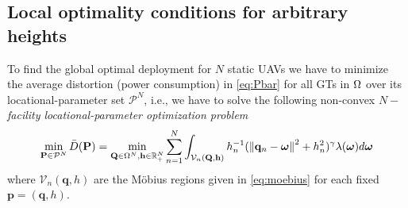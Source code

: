 \documentclass[smallabstract,smallcaptions]{dccpaper}
\renewcommand{\vq}{\mathbf p}
\renewcommand{\vp}{\mathbf q}
\renewcommand{\vQ}{\mathbf P}
\renewcommand{\vP}{\mathbf Q}
\newcommand{\df}{\ensuremath{\lam}}         %
\newcommand{\bH}{\ensuremath{\vh}}          %
\newcommand{\Vor}{\ensuremath{\mathcal{V}}}         %
\newcommand{\Qset}{\ensuremath{\mathcal P}}
\newcommand{\Dis}{\ensuremath{D}}                    %
\newcommand{\AvDis}{\ensuremath{\bar{\Dis}}}         %
\begin{document}
\subsection{Local optimality conditions for arbitrary heights}
%
To find the global optimal deployment for $N$ static UAVs we have to minimize the average distortion (power consumption)
in \eqref{eq:Pbar}  for all GTs in $\Omega$ over its locational-parameter set $\Qset^N$, i.e., we have to solve the following
non-convex \emph{$N-$facility locational-parameter optimization problem} \cite{GJ, GJcom18, GJ18,WJ18} 
%
\begin{align}
  \min_{\vQ\in\Qset^N} \AvDis(\vQ)= \min_{\vP\in\Omega^N,\bH\in \R_+^N} \sum_{n=1}^{N} \int_{\Vor_n(\vP,\bH)}
  h_n^{-1}(\Norm{\vp_n-\vome}^2 +h_n^2)^{\gam}\df(\vome)d\vome\label{eq:phoptlocal} 
\end{align}
%
where $\Vor_n(\vp,h)$ are the Möbius regions given in \eqref{eq:moebius} for each fixed $\vq=(\vp,h)$.
\end{document}
